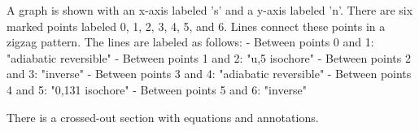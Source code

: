 A graph is shown with an x-axis labeled 's' and a y-axis labeled 'n'. There are six marked points labeled 0, 1, 2, 3, 4, 5, and 6. Lines connect these points in a zigzag pattern. The lines are labeled as follows:
- Between points 0 and 1: "adiabatic reversible"
- Between points 1 and 2: "u,5 isochore"
- Between points 2 and 3: "inverse"
- Between points 3 and 4: "adiabatic reversible"
- Between points 4 and 5: "0,131 isochore"
- Between points 5 and 6: "inverse"

There is a crossed-out section with equations and annotations.